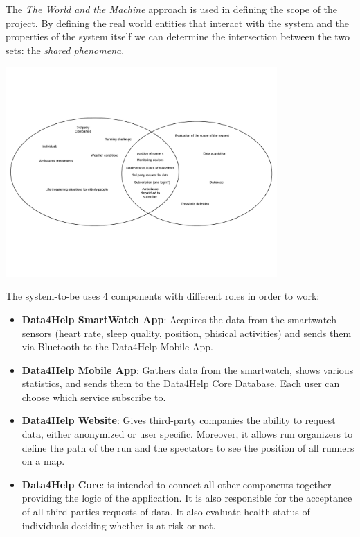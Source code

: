 

The \textit{The World and the Machine} approach is used in defining the scope of the project.
By defining the real world entities that interact with the system and the properties of the system itself we can determine the intersection between the two sets: the \textit{shared phenomena}.
\begin{center}
    \includegraphics[height=8cm,keepaspectratio]{assets/twatm.pdf}
\end{center}

The system-to-be uses 4 components with different roles in order to work:
\begin{itemize}
    \item \textbf{Data4Help SmartWatch App}: Acquires the data from the smartwatch sensors (heart rate, sleep quality, position, phisical activities) and sends them via Bluetooth to the Data4Help Mobile App.
    \item \textbf{Data4Help Mobile App}: Gathers data from the smartwatch, shows various statistics, and sends them to the Data4Help Core Database. Each user can choose which service subscribe to.
    \item \textbf{Data4Help Website}: Gives third-party companies the ability to request data, either anonymized or user specific. Moreover, it allows run organizers to define the path of the run and the spectators to see the position of all runners on a map.
    \item \textbf{Data4Help Core}: is intended to connect all other components together providing the logic of the application. It is also responsible for the acceptance of all third-parties requests of data. It also evaluate health status of individuals deciding whether is at risk or not.
\end{itemize}

